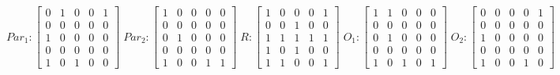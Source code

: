      $$
        Par_{1} : \begin{bmatrix}
            0 & 1 & 0 & 0 & 1 \\
            0 & 0 & 0 & 0 & 0 \\
            1 & 0 & 0 & 0 & 0 \\
			0 & 0 & 0 & 0 & 0 \\
            1 & 0 & 1 & 0 & 0 
        \end{bmatrix}
        \;
        Par_{2} : \begin{bmatrix}
            1 & 0 & 0 & 0 & 0 \\
            0 & 0 & 0 & 0 & 0 \\
            0 & 1 & 0 & 0 & 0 \\
            0 & 0 & 0 & 0 & 0 \\
            1 & 0 & 0 & 1 & 1
        \end{bmatrix}
        \;
        R : \begin{bmatrix}
            1 & 0 & 0 & 0 & 1 \\
            0 & 0 & 1 & 0 & 0 \\
            1 & 1 & 1 & 1 & 1 \\
            1 & 0 & 1 & 0 & 0 \\
            1 & 1 & 0 & 0 & 1
        \end{bmatrix}
        \;
        O_{1} : \begin{bmatrix}
            1 & 1 & 0 & 0 & 0 \\
            0 & 0 & 0 & 0 & 0 \\
            0 & 1 & 0 & 0 & 0 \\
            0 & 0 & 0 & 0 & 0 \\
            1 & 0 & 1 & 0 & 1
        \end{bmatrix}
        \;
        O_{2} : \begin{bmatrix}
            0 & 0 & 0 & 0 & 1 \\
            0 & 0 & 0 & 0 & 0 \\
            1 & 0 & 0 & 0 & 0 \\
            0 & 0 & 0 & 0 & 0 \\
            1 & 0 & 0 & 1 & 0
        \end{bmatrix}
    $$ 
